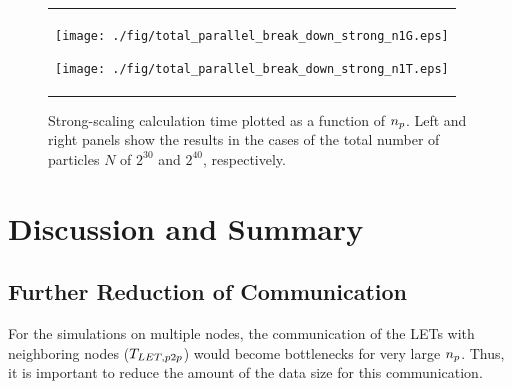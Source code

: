 \documentclass[dvipdfmx]{pasj01}
\begin{document}
\begin{figure}
  \begin{center}
    \begin{tabular}{c}
      
      \begin{minipage}{0.5\hsize}
        \begin{center}
          \texttt{[image: ./fig/total\_parallel\_break\_down\_strong\_n1G.eps]}
        \end{center}
      \end{minipage}

      \begin{minipage}{0.5\hsize}
        \begin{center}
          \texttt{[image: ./fig/total\_parallel\_break\_down\_strong\_n1T.eps]}
        \end{center}
      \end{minipage}
      
    \end{tabular}
  \end{center}
  \caption{Strong-scaling calculation time plotted as a function of
    $n_{\rm p}$. Left and right panels show the results in the cases
    of the total number of particles $N$ of $2^{30}$ and $2^{40}$,
    respectively. }
  \label{fig:total_parallel_break_down}
\end{figure}

\section{Discussion and Summary}

\subsection{Further Reduction of Communication}
\label{sec:summary:comm}

For the simulations on multiple nodes, the communication of the LETs
with neighboring nodes ($T_{\rm LET, p2p}$) would become bottlenecks
for very large $n_{\rm p}$. Thus, it is important to reduce the amount
of the data size for this communication.
\end{document}
